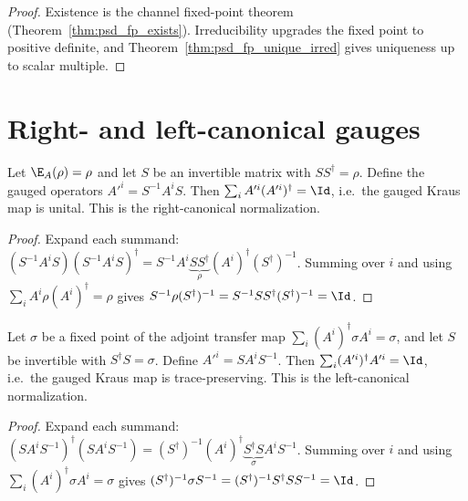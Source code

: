 \begin{proof}\leanok
    Existence is the channel fixed-point theorem
    (Theorem~\ref{thm:psd_fp_exists}). Irreducibility upgrades the fixed point
    to positive definite, and Theorem~\ref{thm:psd_fp_unique_irred} gives
    uniqueness up to scalar multiple.
\end{proof}

\section{Right- and left-canonical gauges}

\begin{theorem}\label{thm:right_canonical_gauge}
    \leanok
    Let $\E_A(\rho) = \rho$ and let $S$ be an invertible matrix with
    $S S^\dagger = \rho$.
    Define the gauged operators $A'^i = S^{-1} A^i S$.
    Then $\sum_i A'^i (A'^i)^\dagger = \Id$, i.e.\ the gauged
    Kraus map is unital. This is the right-canonical normalization.
\end{theorem}

\begin{proof}
    \leanok
    Expand each summand:
    $(S^{-1} A^i S)(S^{-1} A^i S)^\dagger
        = S^{-1} A^i \underbrace{S S^\dagger}_{\rho} (A^i)^\dagger (S^\dagger)^{-1}$.
    Summing over $i$ and using $\sum_i A^i \rho (A^i)^\dagger = \rho$
    gives $S^{-1} \rho (S^\dagger)^{-1}
        = S^{-1} S S^\dagger (S^\dagger)^{-1} = \Id$.
\end{proof}

\begin{theorem}\label{thm:left_canonical_gauge}
    \leanok
    Let $\sigma$ be a fixed point of the adjoint transfer map
    $\sum_i (A^i)^\dagger \sigma A^i = \sigma$,
    and let $S$ be invertible with $S^\dagger S = \sigma$.
    Define $A'^i = S A^i S^{-1}$.
    Then $\sum_i (A'^i)^\dagger A'^i = \Id$, i.e.\ the gauged
    Kraus map is trace-preserving. This is the left-canonical
    normalization.
\end{theorem}

\begin{proof}
    \leanok
    Expand each summand:
    $(S A^i S^{-1})^\dagger (S A^i S^{-1})
        = (S^\dagger)^{-1} (A^i)^\dagger \underbrace{S^\dagger S}_{\sigma} A^i S^{-1}$.
    Summing over $i$ and using $\sum_i (A^i)^\dagger \sigma A^i = \sigma$
    gives $(S^\dagger)^{-1} \sigma S^{-1}
        = (S^\dagger)^{-1} S^\dagger S S^{-1} = \Id$.
\end{proof}

